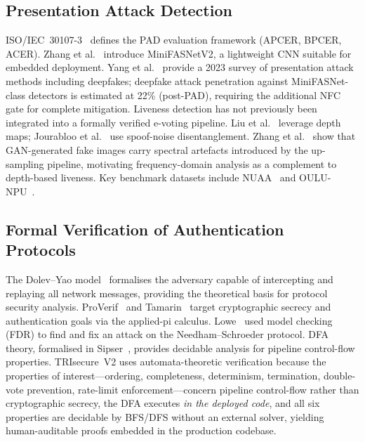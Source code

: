 \documentclass[pdflatex,sn-mathphys-num]{sn-jnl}%
\theoremstyle{thmstyleone}%
\theoremstyle{thmstyletwo}%
\theoremstyle{thmstylethree}%
\begin{document}
\subsection{Presentation Attack Detection}

ISO/IEC~30107-3~\cite{iso30107} defines the PAD evaluation framework (APCER,
BPCER, ACER). Zhang et al.~\cite{zhang2020minifasnet} introduce MiniFASNetV2,
a lightweight CNN suitable for embedded deployment. Yang et
al.~\cite{yang2023pad_survey} provide a 2023 survey of presentation attack
methods including deepfakes; deepfake attack penetration against
MiniFASNet-class detectors is estimated at 22\% (post-PAD), requiring the
additional NFC gate for complete mitigation. Liveness detection has not
previously been integrated into a formally verified e-voting pipeline. Liu et
al.~\cite{liu2018learning} leverage depth maps; Jourabloo et
al.~\cite{jourabloo2018desp} use spoof-noise disentanglement. Zhang et
al.~\cite{zhang2019autoGAN} show that GAN-generated fake images carry spectral
artefacts introduced by the up-sampling pipeline, motivating frequency-domain
analysis as a complement to depth-based liveness. Key benchmark datasets
include NUAA~\cite{tan2010nuaa} and OULU-NPU~\cite{boulkenafet2017oulu}.

\subsection{Formal Verification of Authentication Protocols}

The Dolev--Yao model~\cite{dolev1983security} formalises the adversary capable
of intercepting and replaying all network messages, providing the theoretical
basis for protocol security analysis. ProVerif~\cite{blanchet2016proverif} and
Tamarin~\cite{meier2013tamarin} target cryptographic secrecy and authentication
goals via the applied-pi calculus. Lowe~\cite{lowe1996breaking} used model
checking (FDR) to find and fix an attack on the Needham--Schroeder protocol.
DFA theory, formalised in Sipser~\cite{sipser2012introduction}, provides
decidable analysis for pipeline control-flow properties. TRIsecure~V2 uses
automata-theoretic verification because the properties of
interest---ordering, completeness, determinism, termination, double-vote
prevention, rate-limit enforcement---concern pipeline control-flow rather than
cryptographic secrecy, the DFA executes \emph{in the deployed code}, and all
six properties are decidable by BFS/DFS without an external solver, yielding
human-auditable proofs embedded in the production codebase.
\end{document}
